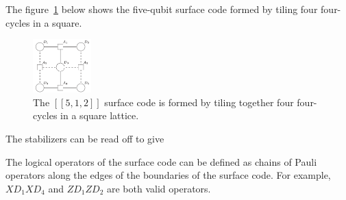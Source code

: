 The figure~\ref{fig:512} below shows the five-qubit surface code formed by tiling four four-cycles in a square.
\begin{figure}[h]
    \centering
    \includegraphics[width=0.2\textwidth]{sections/2_review_surface_code/512.png}
    \caption{The $[[5,1,2]]$ surface code is formed by tiling together four four-cycles in a square lattice.}
    \label{fig:512}
\end{figure}
The stabilizers can be read off to give

The logical operators of the surface code can be defined as chains of Pauli operators along the edges of the boundaries of the surface code. For example, $XD_1XD_4$ and $ZD_1ZD_2$ are both valid operators.

